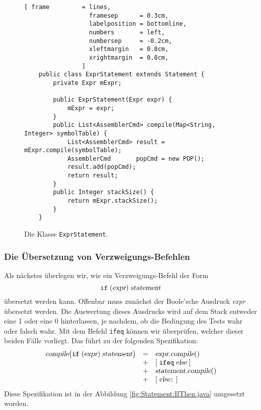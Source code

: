 \begin{figure}[!ht]
\centering
\begin{Verbatim}[ frame         = lines, 
                  framesep      = 0.3cm, 
                  labelposition = bottomline,
                  numbers       = left,
                  numbersep     = -0.2cm,
                  xleftmargin   = 0.8cm,
                  xrightmargin  = 0.8cm,
                ]
    public class ExprStatement extends Statement {
        private Expr mExpr;
    
        public ExprStatement(Expr expr) {
            mExpr = expr;
        }
        public List<AssemblerCmd> compile(Map<String, Integer> symbolTable) {
            List<AssemblerCmd> result = mExpr.compile(symbolTable);
            AssemblerCmd       popCmd = new POP();
            result.add(popCmd);
            return result;
        }    
        public Integer stackSize() {
            return mExpr.stackSize();
        }
    }
\end{Verbatim}
\vspace*{-0.3cm}
\caption{Die Klasse \texttt{ExprStatement}.}
\label{fig:Statement:ExprStatement.java}
\end{figure}

\subsubsection{Die \"Ubersetzung von Verzweigungs-Befehlen}
Als n\"achstes \"uberlegen wir, wie ein Verzweigungs-Befehl der Form
\[ \texttt{if}\; (\textsl{expr})\; \textsl{statement} \]
\"ubersetzt werden kann.  Offenbar muss zun\"achst der Boole'sche Ausdruck \textsl{expr} \"ubersetzt
werden.  Die Auswertung dieses Ausdrucks wird auf dem Stack entweder eine 1 oder eine 0
hinterlassen, je nachdem, ob die Bedingung des Tests wahr oder falsch wahr.  Mit dem Befehl
\texttt{ifeq} k\"onnen wir \"uberpr\"ufen, welcher dieser beiden F\"alle vorliegt.  
Das f\"uhrt zu der folgenden Spezifikation:
\[
   \begin{array}[t]{lcl}
   \textsl{compile}\bigl(\texttt{if}\; (\textsl{expr})\;\textsl{statement}\bigr) & = & 
         \textsl{expr}.\textsl{compile}()  \\
   & + & [\;\texttt{ifeq}\;\textsl{else}\;] \\
   & + & \textsl{statement}.\textsl{compile}() \\
   & + & [\;\textsl{else}\texttt{:}\;]        
\end{array}
\]
Diese Spezifikation ist in der Abbildung \ref{fig:Statement:IfThen.java} umgesetzt worden.



